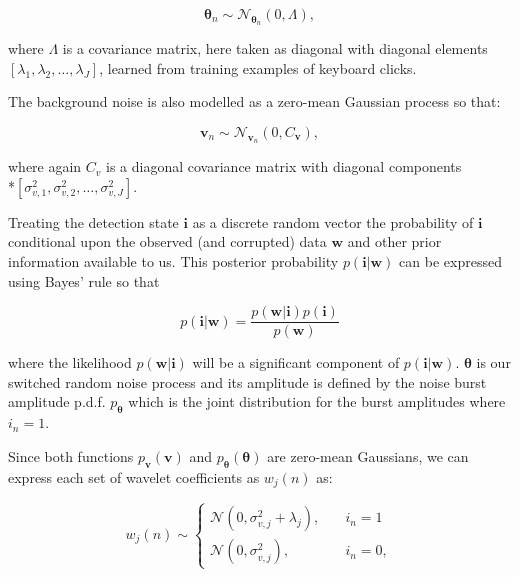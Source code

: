 \begin{equation}\label{eq:burst}
\boldsymbol{\theta}_n \sim \mathcal{N}_{\boldsymbol{\theta}_n}(0,\Lambda),
\end{equation}

where $\Lambda$ is a covariance matrix, here taken as diagonal with diagonal elements $\left[\lambda_{1}, \lambda_{2}, \ldots, \lambda_{J}\right]$, learned from training examples of keyboard clicks.

The background noise is also modelled as a zero-mean Gaussian process so that:

\begin{equation}\label{eq:noise}
\boldsymbol{v}_n \sim \mathcal{N}_{\boldsymbol{v}_n}(0,C_{\boldsymbol{v}}),
\end{equation}

where again $C_v$ is a diagonal covariance matrix with diagonal components \\*$[\sigma_{v,1}^2, \sigma_{v,2}^2, \ldots, \sigma_{v,J}^2]$.

Treating the detection state $\boldsymbol{i}$ as a discrete random vector the probability of $\boldsymbol{i}$ conditional upon the observed (and corrupted) data $\boldsymbol{w}$ and other prior information available to us. This posterior probability $p(\boldsymbol{i}|\boldsymbol{w})$ can be expressed using Bayes' rule so that

\begin{equation}\label{eq:Bayes}
p(\boldsymbol{i}|\boldsymbol{w}) = \frac{p(\boldsymbol{w}|\boldsymbol{i})p(\boldsymbol{i})}{p(\boldsymbol{w})}
\end{equation}

where the likelihood $p(\boldsymbol{w}|\boldsymbol{i})$ will be a significant component of $p(\boldsymbol{i}|\boldsymbol{w})$.
$\boldsymbol{\theta}$ is our switched random noise process and its amplitude is defined by the noise burst amplitude p.d.f. $p_{\boldsymbol{\theta}}$ which is the joint distribution for the burst amplitudes where $i_{n} = 1$.

Since both functions $p_{\boldsymbol{v}}(\boldsymbol{v})$ and $p_{\boldsymbol{\theta}}(\boldsymbol{\theta})$ are zero-mean Gaussians, we can express each set of wavelet coefficients as $w_j(n)$ as:

\begin{equation}\label{eq:cases}
  w_j(n) \sim
  \begin{cases}
    \mathcal{N}(0,\sigma_{v,j}^2 + \lambda_j), & \quad i_n = 1\\
   \mathcal{N}(0,\sigma_{v,j}^2), & \quad i_n = 0,
  \end{cases}
\end{equation}

